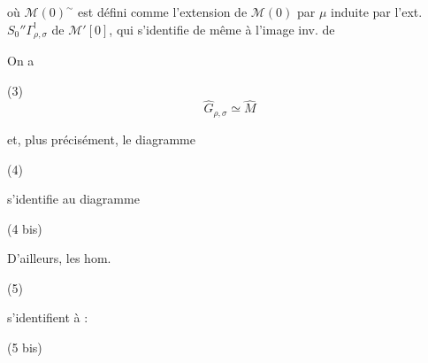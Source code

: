 \begin{enumerate}
où $\mathcal{M}(0)^\sim$ est défini comme l'extension de
$\mathcal{M}(0)$ par $\mu$ induite par l'ext. $S_0'' \Gamma_{\rho,\sigma}^!$ de $\mathcal{M}'[0]$,
qui s'identifie de même à l'image inv. de

\newpage



\newpage



\newpage


On a

(3) $$ \widehat{G}_{\rho,\sigma} \simeq \hat{M} $$

et, plus précisément, le diagramme

(4)

s'identifie au diagramme

(4 bis)

D'ailleurs, les hom.

(5)

s'identifient à :

(5 bis)


\end{enumerate}
